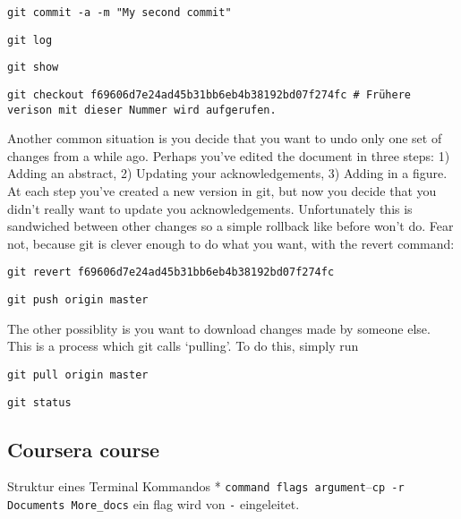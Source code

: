 \documentclass[]{article}
\begin{document}
\begin{verbatim}
git commit -a -m "My second commit"
\end{verbatim}

\begin{verbatim}
git log
\end{verbatim}

\begin{verbatim}
git show
\end{verbatim}

\begin{verbatim}
git checkout f69606d7e24ad45b31bb6eb4b38192bd07f274fc # Frühere verison mit dieser Nummer wird aufgerufen.
\end{verbatim}

Another common situation is you decide that you want to undo only one
set of changes from a while ago. Perhaps you've edited the document in
three steps: 1) Adding an abstract, 2) Updating your acknowledgements,
3) Adding in a figure. At each step you've created a new version in git,
but now you decide that you didn't really want to update you
acknowledgements. Unfortunately this is sandwiched between other changes
so a simple rollback like before won't do. Fear not, because git is
clever enough to do what you want, with the revert command:

\begin{verbatim}
git revert f69606d7e24ad45b31bb6eb4b38192bd07f274fc
\end{verbatim}

\begin{verbatim}
git push origin master
\end{verbatim}

The other possiblity is you want to download changes made by someone
else. This is a process which git calls `pulling'. To do this, simply
run

\begin{verbatim}
git pull origin master
\end{verbatim}

\begin{verbatim}
git status
\end{verbatim}

\subsection{Coursera course}\label{coursera-course}

Struktur eines Terminal Kommandos *
\texttt{command flags argument}--\texttt{cp -r Documents More\_docs} ein
flag wird von \texttt{-} eingeleitet.
\end{document}
